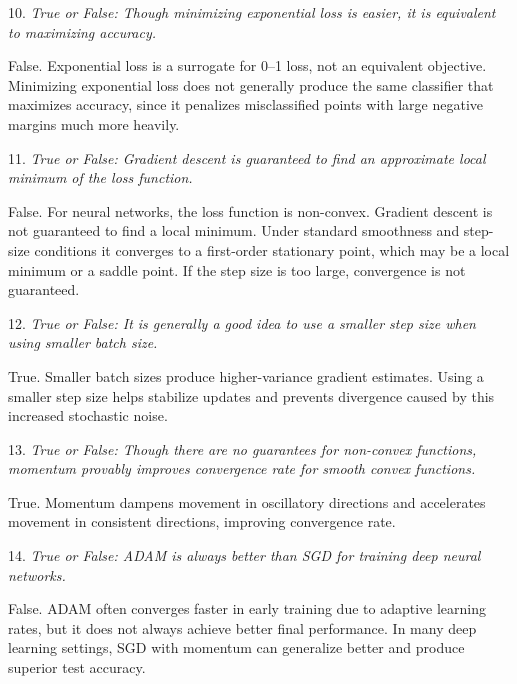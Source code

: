 \vspace{1cm}

10. \textit{True or False: Though minimizing exponential loss is easier, it is equivalent to maximizing accuracy.}

False. Exponential loss is a surrogate for 0–1 loss, not an equivalent objective. Minimizing exponential loss does not generally produce the same classifier that maximizes accuracy, since it penalizes misclassified points with large negative margins much more heavily.

\vspace{1cm}

11. \textit{True or False: Gradient descent is guaranteed to find an approximate local minimum of the loss function.}

False. For neural networks, the loss function is non-convex. Gradient descent is not guaranteed to find a local minimum. Under standard smoothness and step-size conditions it converges to a first-order stationary point, which may be a local minimum or a saddle point. If the step size is too large, convergence is not guaranteed.

\vspace{1cm}

12. \textit{True or False: It is generally a good idea to use a smaller step size when using smaller batch size.}

True. Smaller batch sizes produce higher-variance gradient estimates. Using a smaller step size helps stabilize updates and prevents divergence caused by this increased stochastic noise.

\vspace{1cm}

13. \textit{True or False: Though there are no guarantees for non-convex functions, momentum provably improves convergence rate for smooth convex functions.}

True. Momentum dampens movement in oscillatory directions and accelerates movement in consistent directions, improving convergence rate.

\vspace{1cm}

14. \textit{True or False: ADAM is always better than SGD for training deep neural networks.}

False. ADAM often converges faster in early training due to adaptive learning rates, but it does not always achieve better final performance. In many deep learning settings, SGD with momentum can generalize better and produce superior test accuracy.

